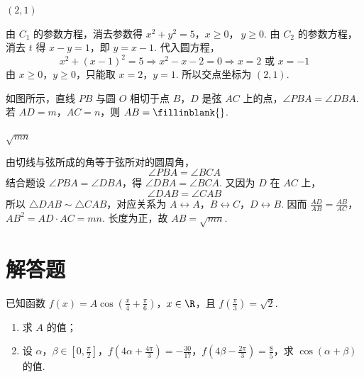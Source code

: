 \begin{answer}
\((2,1)\)
\end{answer}

\begin{solution}
由 \(C_1\) 的参数方程，消去参数得
\(x^2+y^2=5\)，\(x\geqslant0\)，\(\ y\geqslant0\).
由 \(C_2\) 的参数方程，消去 \(t\) 得 \(x-y=1\)，即 \(y=x-1\). 代入圆方程，
\[
x^2+(x-1)^2=5
\Longrightarrow x^2-x-2=0
\Longrightarrow x=2\text{ 或 }x=-1
\]
由 \(x\geqslant0\)，\(y\geqslant0\)，只能取 \(x=2\)，\(y=1\). 所以交点坐标为 \((2,1)\).
\end{solution}

\begin{problem}
如图所示，直线 \(PB\) 与圆 \(O\) 相切于点 \(B\)，\(D\) 是弦 \(AC\) 上的点，\(\angle PBA = \angle DBA\). 若 \(AD = m\)，\(AC = n\)，则 \(AB =\fillinblank{}\).

\end{problem}

\begin{answer}
\(\sqrt{mn}\)
\end{answer}

\begin{solution}
由切线与弦所成的角等于弦所对的圆周角，
\[
\angle PBA=\angle BCA
\]
结合题设 \(\angle PBA=\angle DBA\)，得 \(\angle DBA=\angle BCA\). 又因为 \(D\) 在 \(AC\) 上，
\[
\angle DAB=\angle CAB
\]
所以 \(\triangle DAB\sim\triangle CAB\)，对应关系为 \(A\leftrightarrow A\)，\(B\leftrightarrow C\)，\(D\leftrightarrow B\). 因而
\(\frac{AD}{AB}=\frac{AB}{AC}\)，\(AB^2=AD\cdot AC=mn\).
长度为正，故 \(AB=\sqrt{mn}\).
\end{solution}

\section{解答题}

\begin{problem}
已知函数 \(f(x) = A \cos \left( \frac{x}{4} + \frac{\pi}{6} \right)\)，\(x \in \R\)，且 \( f\left( \frac{\pi}{3} \right) = \sqrt{2} \).
\begin{enumerate}
\item 求 \(A\) 的值；
\item 设 \(\alpha\)，\(\beta \in \left[0, \frac{\pi}{2}\right]\)，\(f\left(4\alpha + \frac{4\pi}{3}\right) = -\frac{30}{17}\)，\(f\left(4\beta - \frac{2\pi}{3}\right) = \frac{8}{5}\)，求 \(\cos (\alpha + \beta)\) 的值.
\end{enumerate}
\end{problem}

